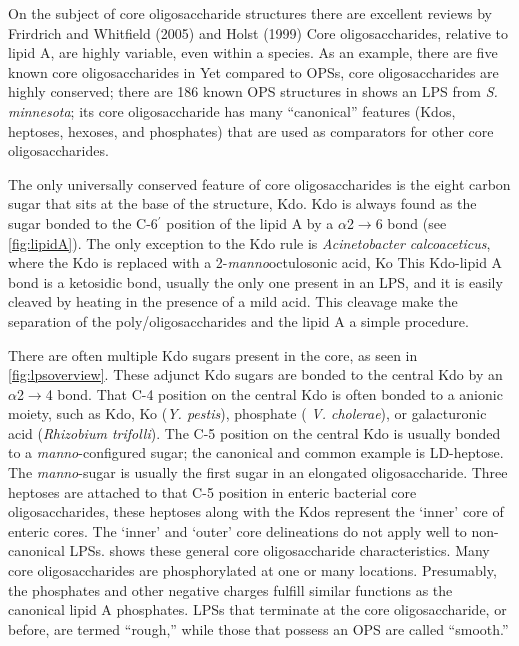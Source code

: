     On the subject of core oligosaccharide structures there are excellent reviews by Frirdrich and Whitfield (2005) and Holst
(1999) Core oligosaccharides, relative to lipid A, are highly variable, even within a species. As an example, there are five known core
oligosaccharides in \ecoli{} Yet compared to \acp{OPS}, core oligosaccharides are highly conserved; there are 186 known \ac{OPS} structures in
\ecoli{}  shows an \ac{LPS} from \textit{S. minnesota}; its core oligosaccharide has many ``canonical'' features (\eg Kdos, heptoses,
hexoses, and phosphates) that are used as comparators for other core oligosaccharides.

 The only universally conserved feature of core oligosaccharides is the eight carbon sugar that sits at the base of the structure,
Kdo. Kdo is always found as the sugar bonded to the C-6$^\prime$ position of the lipid A by a $\alpha$2$\rightarrow$6 bond (see \cref{fig:lipidA}). The only exception to the Kdo
rule is \textit{Acinetobacter calcoaceticus}, where the Kdo is replaced with a 2-\textit{manno}octulosonic acid, Ko This Kdo-lipid A bond is a
ketosidic bond, usually the only one present in an \ac{LPS}, and it is easily cleaved by heating in the presence of a mild acid. This cleavage make the separation of the
poly/oligosaccharides and the lipid A a simple procedure.

There are often multiple Kdo sugars present in the core, as seen in \cref{fig:lpsoverview}. These adjunct Kdo sugars are bonded to the central Kdo by an $\alpha$2$\rightarrow$4
bond. That C-4 position on the central Kdo is often bonded to a anionic moiety, such as Kdo, Ko (\textit{Y. pestis}), phosphate ( \textit{V.
cholerae}), or galacturonic acid (\textit{Rhizobium trifolli}). The C-5 position on the central Kdo is usually bonded to a
\textit{manno}-configured sugar; the canonical and common example is LD-heptose. The \textit{manno}-sugar is usually the first sugar in an elongated oligosaccharide. Three heptoses
are attached to that C-5 position in enteric bacterial core oligosaccharides, these heptoses along with the Kdos represent the `inner' core of enteric cores. The `inner' and
`outer' core delineations do not apply well to non-canonical \acp{LPS}.  shows these general core oligosaccharide characteristics. Many core oligosaccharides
are phosphorylated at one or many locations. Presumably, the phosphates and other negative charges fulfill similar functions as the canonical lipid A phosphates. \Acp{LPS} that
terminate at the core oligosaccharide, or before, are termed ``rough,'' while those that possess an \ac{OPS} are called ``smooth.''

